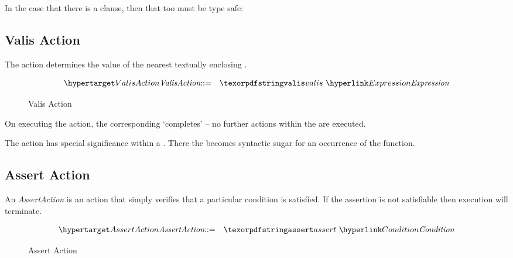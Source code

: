 In the case that there is a  clause, then that too must be type safe:
\begin{prooftree}
\end{prooftree}

\subsection{Valis Action}
\label{valisAction}

The  action determines the value of the nearest textually enclosing  .

\begin{figure}[htbp]
\begin{eqnarray*}
\ntDef{ValisAction}&\arrow&\q{valis}\ \ntRef{Expression}
\end{eqnarray*}
\caption{Valis Action}
\label{valisActionFig}
\end{figure}

On executing the  action, the corresponding  `completes' -- no further actions within the  are executed.


\begin{aside}
The  action has special significance within a . There the  becomes syntactic sugar for an occurrence of the  function.
\end{aside}

\subsection{Assert Action}
\label{assert}
An \emph{AssertAction} is an action that simply verifies that a particular condition is satisfied. If the assertion is not satisfiable then execution will terminate.

\begin{figure}[htbp]
\begin{eqnarray*}
\ntDef{AssertAction}&\arrow&\q{assert}\ \ntRef{Condition}
\end{eqnarray*}
\caption{Assert Action}\label{assertActionFig}
\end{figure}

